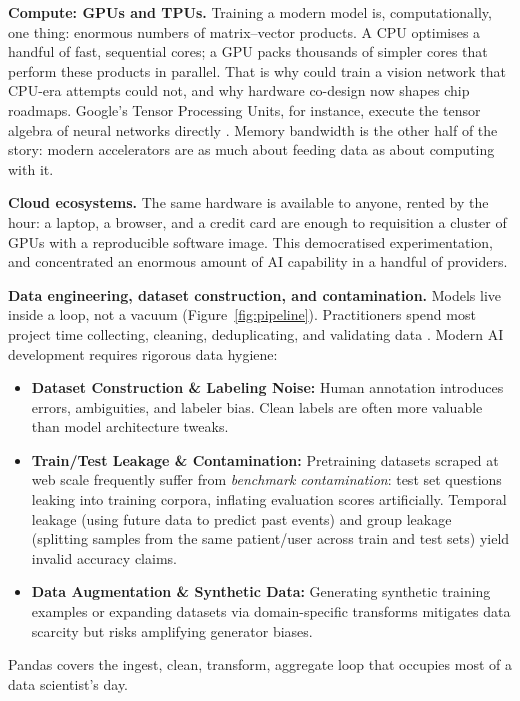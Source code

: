 \documentclass[11pt,a4paper]{article}
\begin{document}
	\textbf{Compute: GPUs and TPUs.} Training a modern model is,
	computationally, one thing: enormous numbers of matrix--vector
	products. A CPU optimises a handful of fast, sequential cores; a GPU
	packs thousands of simpler cores that perform these products in
	parallel. That is why \textcite{krizhevsky2012} could train a vision
	network that CPU-era attempts could not, and why hardware co-design now
	shapes chip roadmaps. Google's Tensor Processing Units, for instance,
	execute the tensor algebra of neural networks directly
	\parencite{jouppi2017}. Memory bandwidth is the other half of the story:
	modern accelerators are as much about feeding data as about computing
	with it.
	
	\textbf{Cloud ecosystems.} The same hardware is available to anyone,
	rented by the hour: a laptop, a browser, and a credit card are enough
	to requisition a cluster of GPUs with a reproducible software image.
	This democratised experimentation, and concentrated an enormous
	amount of AI capability in a handful of providers.
	
	\textbf{Data engineering, dataset construction, and contamination.} Models live inside a loop, not a vacuum
	(Figure~\ref{fig:pipeline}). Practitioners spend most project time collecting, cleaning, deduplicating, and validating data \parencite{mckinney2010}. Modern AI development requires rigorous data hygiene:
	\begin{itemize}[nosep]
		\item \textbf{Dataset Construction \& Labeling Noise:} Human annotation introduces errors, ambiguities, and labeler bias. Clean labels are often more valuable than model architecture tweaks.
		\item \textbf{Train/Test Leakage \& Contamination:} Pretraining datasets scraped at web scale frequently suffer from \emph{benchmark contamination}: test set questions leaking into training corpora, inflating evaluation scores artificially. Temporal leakage (using future data to predict past events) and group leakage (splitting samples from the same patient/user across train and test sets) yield invalid accuracy claims.
		\item \textbf{Data Augmentation \& Synthetic Data:} Generating synthetic training examples or expanding datasets via domain-specific transforms mitigates data scarcity but risks amplifying generator biases.
	\end{itemize}
	
	\begin{practicebox}

		Pandas covers the ingest, clean, transform, aggregate loop
		that occupies most of a data scientist's day.
	\end{practicebox}
	
\end{document}
